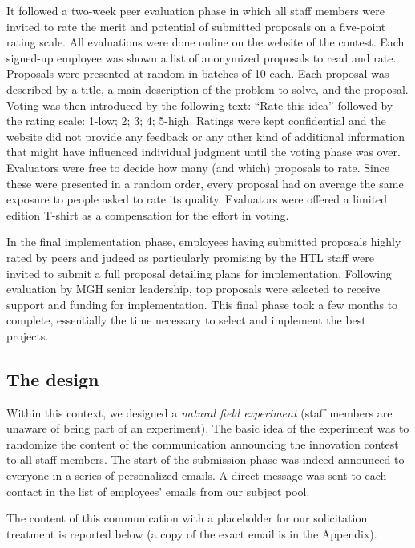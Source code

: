 \documentclass[12pt, titlepage]{article}
\begin{document}
It followed a two-week peer evaluation phase in which all staff members
were invited to rate the merit and potential of submitted proposals on a
five-point rating scale. All evaluations were done online on the website
of the contest. Each signed-up employee was shown a list of anonymized
proposals to read and rate. Proposals were presented at random in
batches of 10 each. Each proposal was described by a title, a main
description of the problem to solve, and the proposal. Voting was then
introduced by the following text: ``Rate this idea'' followed by the
rating scale: 1-low; 2; 3; 4; 5-high. Ratings were kept confidential and
the website did not provide any feedback or any other kind of additional
information that might have influenced individual judgment until the
voting phase was over. Evaluators were free to decide how many (and
which) proposals to rate. Since these were presented in a random order,
every proposal had on average the same exposure to people asked to rate
its quality. Evaluators were offered a limited edition T-shirt as a
compensation for the effort in voting.

In the final implementation phase, employees having submitted proposals
highly rated by peers and judged as particularly promising by the HTL
staff were invited to submit a full proposal detailing plans for
implementation. Following evaluation by MGH senior leadership, top
proposals were selected to receive support and funding for
implementation. This final phase took a few months to complete,
essentially the time necessary to select and implement the best
projects.

\subsection{The design}\label{the-design}

Within this context, we designed a \emph{natural field experiment}
(staff members are unaware of being part of an experiment). The basic
idea of the experiment was to randomize the content of the communication
announcing the innovation contest to all staff members. The start of the
submission phase was indeed announced to everyone in a series of
personalized emails. A direct message was sent to each contact in the
list of employees' emails from our subject pool.

The content of this communication with a placeholder for our
solicitation treatment is reported below (a copy of the exact email is
in the Appendix).
\end{document}
